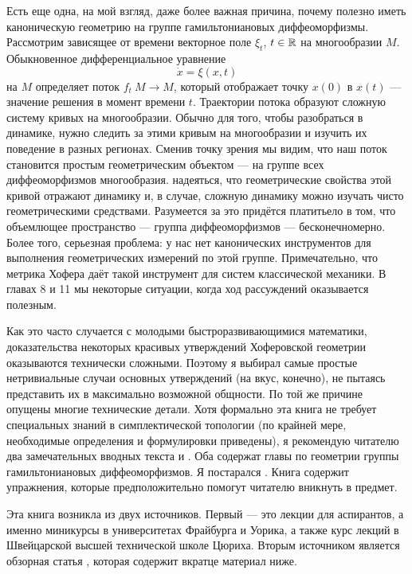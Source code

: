 Есть еще одна, на мой взгляд, даже более важная причина, почему полезно иметь каноническую геометрию на группе гамильтониановых диффеоморфизмы.
Рассмотрим зависящее от времени векторное поле $\xi_t$, $t\in \mathbb{R}$ на многообразии $M$.
Обыкновенное дифференциальное уравнение
\[\dot x=\xi(x,t)\]
на $M$ определяет поток $f_t\: M \to M$, который отображает точку $x(0)$ в $x(t)$ --- значение решения в момент времени $t$.
Траектории потока образуют сложную систему кривых на многообразии.
Обычно для того, чтобы разобраться в динамике, нужно следить за этими кривым на многообразии и изучить их поведение в разных регионах.
Сменив точку зрения мы видим, что наш поток становится простым
геометрическим объектом ---  на группе всех диффеоморфизмов многообразия.
 надеяться, что геометрические свойства этой кривой отражают динамику и, в  случае, сложную динамику можно изучать чисто геометрическими средствами.
Разумеется за это придётся платитьело в том, что объемлющее пространство --- группа
диффеоморфизмов --- бесконечномерно.
Более того,  серьезная проблема:
 у нас нет канонических инструментов для выполнения геометрических измерений по этой группе.
Примечательно, что метрика Хофера даёт такой инструмент для систем классической механики.
В главах 8 и 11 мы  некоторые ситуации,
когда  ход рассуждений оказывается полезным.

Как это часто случается с молодыми быстроразвивающимися  математики, доказательства некоторых красивых утверждений Хоферовской геометрии оказываются технически сложными.
Поэтому я выбирал самые простые нетривиальные случаи основных утверждений (на  вкус, конечно), не пытаясь представить их в максимально возможной общности.
По той же причине опущены многие технические детали.
Хотя формально эта книга не требует специальных знаний в симплектической топологии (по крайней мере, необходимые определения и формулировки приведены), я рекомендую читателю  два замечательных вводных текста \cite{HZ} и \cite{MS}.
Оба содержат главы по геометрии группы гамильтониановых диффеоморфизмов.
Я постарался .
Книга содержит упражнения, которые предположительно помогут читателю вникнуть в предмет.

Эта книга возникла из двух источников.
Первый --- это лекции для аспирантов, а именно миникурсы в университетах Фрайбурга и Уорика, а также курс лекций в Швейцарской высшей технической школе Цюриха.
Вторым источником является обзорная статья \cite{P8}, которая содержит
вкратце материал  ниже.

